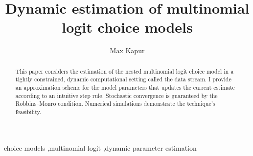\documentclass[preprint,12pt,authoryear]{elsarticle}
\begin{document}
\begin{frontmatter}


 \title{Dynamic estimation of multinomial logit choice models}
 \author{Max Kapur}

\begin{abstract}
This paper considers the estimation of the nested multinomial logit choice model in a tightly constrained, dynamic computational setting called the data stream. I provide an approximation scheme for the model parameters that updates the current estimate according to an intuitive step rule. Stochastic convergence is guaranteed by the Robbins--Monro condition. Numerical simulations demonstrate the technique's feasibility.
\end{abstract}



\begin{keyword}
choice models \sep multinomial logit \sep dynamic parameter estimation



\end{keyword}

\end{frontmatter}
\end{document}
